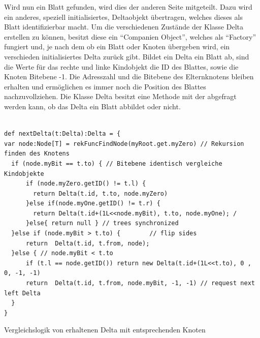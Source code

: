 \documentclass[a4paper,11pt,oneside,%
headsepline,												%
footsepline,												%
bibtotocnumbered									%
]{scrreprt}
\begin{document}
Wird nun ein Blatt gefunden, wird dies der anderen Seite mitgeteilt. Dazu wird ein anderes, speziell initialisiertes, Deltaobjekt übertragen, welches dieses als Blatt identifizierbar macht. Um die verschiedenen Zustände der Klasse Delta erstellen zu können, besitzt diese ein \enquote{Companien Object}, welches als \enquote{Factory} fungiert und, je nach dem ob ein Blatt oder Knoten übergeben wird, ein verschieden initialisiertes Delta zurück gibt. Bildet ein Delta ein Blatt ab, sind die Werte für das rechte und linke Kindobjekt die \ac{ID} des Blattes, sowie die Knoten Bitebene -1. Die Adresszahl und die Bitebene des Elternknotens bleiben erhalten und ermöglichen es immer noch die Position des Blattes nachzuvollziehen. Die Klasse Delta besitzt eine Methode mit der abgefragt werden kann, ob das Delta ein Blatt abbildet oder nicht.\\\\
\begin{listing}[H]
	\begin{verbatim}
def nextDelta(t:Delta):Delta = {
var node:Node[T] = rekFuncFindNode(myRoot.get.myZero) // Rekursion finden des Knotens
  if (node.myBit == t.to) { // Bitebene identisch vergleiche Kindobjekte
      if (node.myZero.getID() != t.l) {
        return Delta(t.id, t.to, node.myZero)
      }else if(node.myOne.getID() != t.r) {
        return Delta(t.id+(1L<<node.myBit), t.to, node.myOne); /
      }else{ return null } // trees synchronized
  }else if (node.myBit > t.to) {        // flip sides
      return  Delta(t.id, t.from, node); 
  }else { // node.myBit < t.to
      if (t.l == node.getID()) return new Delta(t.id+(1L<<t.to), 0 , 0, -1, -1)
      return  Delta(t.id, t.from, node.myBit, -1, -1) // request next left Delta
  }
}
	\end{verbatim}
	\caption{Vergleichslogik von erhaltenen Delta mit entsprechenden Knoten}
	\label{lst:DeltaComp}
\end{listing}
\end{document}
